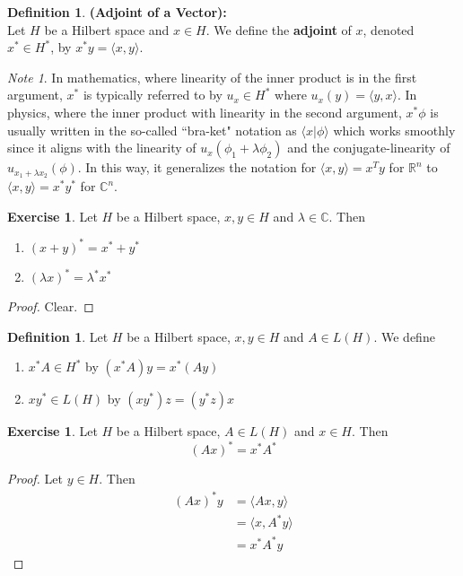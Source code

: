 \documentclass[12pt]{amsart}
\theoremstyle{definition}
\newtheorem{defn}[definition]{Definition}
\theoremstyle{remark}
\newtheorem{note}[remark]{Note}
\theoremstyle{definition}
\newtheorem{ex}[definition]{Exercise}
\newcommand{\lam}{\lambda}
\newcommand{\C}{\mathbb{C}}
\newcommand{\R}{\mathbb{R}}
\renewcommand{\r}{\rangle}
\renewcommand{\l}{\langle}
\begin{document}
\begin{defn}\textbf{(Adjoint of a Vector):} \\
	Let $H$ be a Hilbert space and $x \in H$. We define the \textbf{adjoint} of $x$, denoted $x^* \in H^*$, by $x^* y = \l x, y \r$. 
\end{defn}

\begin{note}
	In mathematics, where linearity of the inner product is in the first argument, $x^{*}$ is typically referred to by $u_{x} \in H^{*} $ where $u_{x}(y) = \l y, x\r$. In physics, where the inner product with linearity in the second argument, $x^{*} \phi$ is usually written in the so-called ``bra-ket" notation as $\l x | \phi \r$ which works smoothly since it aligns with the linearity of $u_{x}(\phi_1 + \lam \phi_2)$ and the conjugate-linearity of $u_{x_1 + \lam x_2}(\phi)$. In this way, it generalizes the notation for $\l x, y\r = x^T y$ for $\R^n$ to $\l x, y\r = x^*y^*$ for $\C^n$. 
\end{note}

\begin{ex}
	Let $H$ be a Hilbert space, $x, y \in H$ and $\lam \in \C$. Then 
	\begin{enumerate}
		\item $(x + y)^* =  x^* + y^*$
		\item $(\lam x)^* = \lam^* x^*$
	\end{enumerate}
\end{ex}

\begin{proof}
	Clear.
\end{proof}

\begin{defn}
	Let $H$ be a Hilbert space, $x, y \in H$ and $A \in L(H)$. We define 
	\begin{enumerate}
		\item $x^* A \in H^*$ by $(x^*A) y = x^*(A y)$
		\item $x y^* \in L(H)$ by $(x y^*) z = (y^*z) x$
	\end{enumerate}
\end{defn}

\begin{ex}
	Let $H$ be a Hilbert space, $A \in L(H)$ and $x \in H$. Then $$(A x)^*= x^*A^*$$
\end{ex}

\begin{proof}
	Let $y \in H$. Then 
	\begin{align*}
		(Ax)^*	y 
		&= \l Ax, y \r \\
		&= \l x, A^* y \r \\
		&= x^*A^* y
	\end{align*}
\end{proof}
\end{document}
